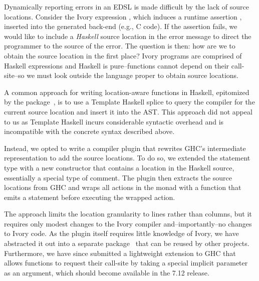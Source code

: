 
Dynamically reporting errors in an EDSL is made difficult by the lack of
source locations. Consider the Ivory expression \hbox{,} which induces a
runtime assertion , inserted into the generated back-end (e.g., C code). If the assertion fails, we would like to include
a \emph{Haskell} source location in the error message to direct the programmer to the source of
the error. The question is then: how are we to obtain the source location in the first place?
Ivory programs are comprised of Haskell expressions and Haskell is
pure--functions cannot depend on their call-site--so we must look outside the
language proper to obtain source locations.

A common approach for writing location-aware functions in Haskell, epitomized by
the  package~\cite{file-location}, is to use a Template
Haskell splice to query the compiler for the current source location and insert
it into the AST. This approach did not appeal to us as Template Haskell incurs
considerable syntactic overhead and is incompatible with the concrete syntax
described above.  

Instead, we opted to write a compiler plugin that rewrites GHC's intermediate
representation to add the source locations. To do so, we extended the  statement type with a new
 constructor that contains a location in the Haskell source,
essentially a special type of comment. The plugin then extracts the source
locations from GHC and wraps all actions in the  monad with a
 function that emits a  statement before executing
the wrapped action.

The approach limits the location granularity to
lines rather than columns, but it requires only modest changes to the
Ivory compiler and--importantly--no changes to Ivory code. As the plugin
itself requires little knowledge of Ivory, we have abstracted it out into a
separate package~\cite{ghc-srcspan-plugin} that can be reused by other projects.
Furthermore, we have since submitted a lightweight extension to GHC that allows
functions to request their call-site by taking a special implicit
parameter~\cite{lewis2000implicit} as an argument, which should become available
in the 7.12 release.
